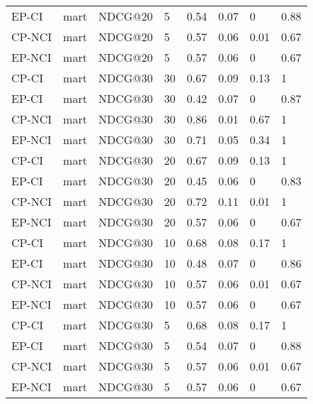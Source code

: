 \begin{landscape}
\begin{longtable}{|*{8}{l|}}
EP-CI&mart&NDCG@20&5&0.54&0.07&0&0.88\\
CP-NCI&mart&NDCG@20&5&0.57&0.06&0.01&0.67\\
EP-NCI&mart&NDCG@20&5&0.57&0.06&0&0.67\\
\hline
CP-CI&mart&NDCG@30&30&0.67&0.09&0.13&1\\
EP-CI&mart&NDCG@30&30&0.42&0.07&0&0.87\\
CP-NCI&mart&NDCG@30&30&0.86&0.01&0.67&1\\
EP-NCI&mart&NDCG@30&30&0.71&0.05&0.34&1\\
\hline
CP-CI&mart&NDCG@30&20&0.67&0.09&0.13&1\\
EP-CI&mart&NDCG@30&20&0.45&0.06&0&0.83\\
CP-NCI&mart&NDCG@30&20&0.72&0.11&0.01&1\\
EP-NCI&mart&NDCG@30&20&0.57&0.06&0&0.67\\
\hline
CP-CI&mart&NDCG@30&10&0.68&0.08&0.17&1\\
EP-CI&mart&NDCG@30&10&0.48&0.07&0&0.86\\
CP-NCI&mart&NDCG@30&10&0.57&0.06&0.01&0.67\\
EP-NCI&mart&NDCG@30&10&0.57&0.06&0&0.67\\
\hline
CP-CI&mart&NDCG@30&5&0.68&0.08&0.17&1\\
EP-CI&mart&NDCG@30&5&0.54&0.07&0&0.88\\
CP-NCI&mart&NDCG@30&5&0.57&0.06&0.01&0.67\\
EP-NCI&mart&NDCG@30&5&0.57&0.06&0&0.67\\
\hline
\hline
\end{longtable}
\end{landscape}
